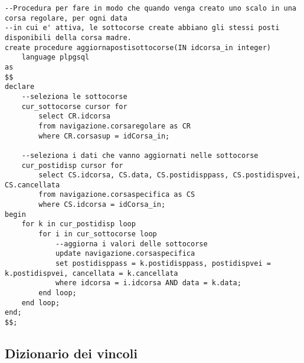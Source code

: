 \begin{lstlisting}[style=sqlstyle]
--Procedura per fare in modo che quando venga creato uno scalo in una corsa regolare, per ogni data
--in cui e' attiva, le sottocorse create abbiano gli stessi posti disponibili della corsa madre.
create procedure aggiornapostisottocorse(IN idcorsa_in integer)
    language plpgsql
as
$$
declare
    --seleziona le sottocorse
    cur_sottocorse cursor for
        select CR.idcorsa
        from navigazione.corsaregolare as CR
        where CR.corsasup = idCorsa_in;

    --seleziona i dati che vanno aggiornati nelle sottocorse
    cur_postidisp cursor for
        select CS.idcorsa, CS.data, CS.postidisppass, CS.postidispvei, CS.cancellata
        from navigazione.corsaspecifica as CS
        where CS.idcorsa = idCorsa_in;
begin
    for k in cur_postidisp loop
        for i in cur_sottocorse loop
            --aggiorna i valori delle sottocorse
            update navigazione.corsaspecifica
            set postidisppass = k.postidisppass, postidispvei = k.postidispvei, cancellata = k.cancellata
            where idcorsa = i.idcorsa AND data = k.data;
        end loop;
    end loop;
end;
$$;
\end{lstlisting}
\newpage

\subsection{Dizionario dei vincoli}




